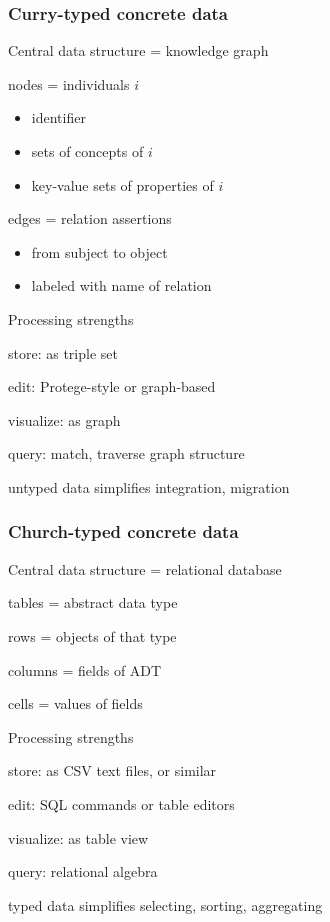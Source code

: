 \documentclass{beamer}
\begin{document}
\begin{frame}\frametitle{Curry-typed concrete data}
\begin{blockitems}{Central data structure = knowledge graph}
\item nodes = individuals $i$
 \begin{itemize}
 \item identifier
 \item sets of concepts of $i$
 \item key-value sets of properties of $i$
 \end{itemize}
\item edges = relation assertions
 \begin{itemize}
 \item from subject to object
 \item labeled with name of relation
 \end{itemize}
\end{blockitems}

\begin{blockitems}{Processing strengths}
\item store: as triple set
\item edit: Protege-style or graph-based
\item visualize: as graph
\item query: match, traverse graph structure
\item untyped data simplifies integration, migration
\end{blockitems}
\end{frame}

\begin{frame}\frametitle{Church-typed concrete data}
\begin{blockitems}{Central data structure = relational database}
\item tables = abstract data type
\item rows = objects of that type
\item columns = fields of ADT
\item cells = values of fields
\end{blockitems}

\begin{blockitems}{Processing strengths}
\item store: as CSV text files, or similar
\item edit: SQL commands or table editors
\item visualize: as table view
\item query: relational algebra
\item typed data simplifies selecting, sorting, aggregating
\end{blockitems}
\end{frame}
\end{document}
